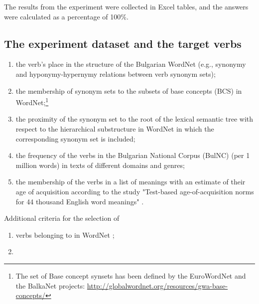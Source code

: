 \documentclass[output=paper,colorlinks,citecolor=brown]{langscibook}
\begin{document}
The results from the experiment were collected in Excel tables, and the answers were calculated as a percentage of 100\%. 

\subsection{The experiment dataset and the target verbs}\label{sec:3.1}
\begin{enumerate}
\item[(1)] the verb's place in the structure of the Bulgarian WordNet (e.g., synonymy and hyponymy-hypernymy relations between verb synonym sets);

\item[(2)] the membership of synonym sets to the subsets of base concepts (BCS) in WordNet;\footnote{The set of Base concept synsets has been defined by the EuroWordNet and the BalkaNet projects: \url{http://globalwordnet.org/resources/gwa-base-concepts/}}

\item[(3)] the proximity of the synonym set to the root of the lexical semantic tree with respect to the hierarchical substructure in WordNet in which the corresponding synonym set is included; 

\item[(4)] the frequency of the verbs in the Bulgarian National Corpus (BulNC) \citep{Koevaetall:12} (per 1 million words) in texts of different domains and genres; 

\item[(5)] the membership of the verbs in a list of meanings with an estimate of their age of acquisition according to the study "Test-based age-of-acquisition norms for 44 thousand English word meanings" \citep{BrysbaertBiemiller2017}.
\end{enumerate}
Additional criteria for the selection of  
\begin{enumerate}
\item[(6)] verbs belonging to  in WordNet \citep{Milleretall:90};

\item[(7)]  
\end{enumerate}
\end{document}
